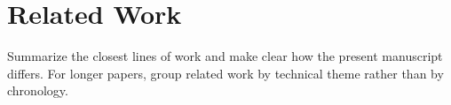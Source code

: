 \section{Related Work}

Summarize the closest lines of work and make clear how the present manuscript
differs. For longer papers, group related work by technical theme rather than by
chronology.
